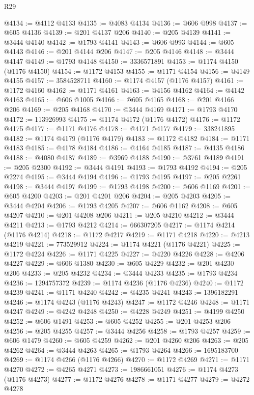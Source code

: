 \begin{lexlean}{R29}
\begin{coremodule}
@4134 := @4112 @4133
@4135 := @4083 @4134
@4136 := @606 @998
@4137 := @605 @4136
@4139 := @201 @4137 @206
@4140 := @205 @4139
@4141 := @3444 @4140
@4142 := @1793 @4141
@4143 := @606 @993
@4144 := @605 @4143
@4146 := @201 @4144 @206
@4147 := @205 @4146
@4148 := @3444 @4147
@4149 := @1793 @4148
@4150 := 3336571891
@4153 := @1174 @4150 (@1176 @4150)
@4154 := @1172 @4153
@4155 := @1171 @4154
@4156 := @4149 @4155
@4157 := 3584528711
@4160 := @1174 @4157 (@1176 @4157)
@4161 := @1172 @4160
@4162 := @1171 @4161
@4163 := @4156 @4162
@4164 := @4142 @4163
@4165 := @606 @1005
@4166 := @605 @4165
@4168 := @201 @4166 @206
@4169 := @205 @4168
@4170 := @3444 @4169
@4171 := @1793 @4170
@4172 := 113926993
@4175 := @1174 @4172 (@1176 @4172)
@4176 := @1172 @4175
@4177 := @1171 @4176
@4178 := @4171 @4177
@4179 := 338241895
@4182 := @1174 @4179 (@1176 @4179)
@4183 := @1172 @4182
@4184 := @1171 @4183
@4185 := @4178 @4184
@4186 := @4164 @4185
@4187 := @4135 @4186
@4188 := @4080 @4187
@4189 := @3969 @4188
@4190 := @3761 @4189
@4191 := @205 @2300
@4192 := @3444 @4191
@4193 := @1793 @4192
@4194 := @205 @2274
@4195 := @3444 @4194
@4196 := @1793 @4195
@4197 := @205 @2261
@4198 := @3444 @4197
@4199 := @1793 @4198
@4200 := @606 @1169
@4201 := @605 @4200
@4203 := @201 @4201 @206
@4204 := @205 @4203
@4205 := @3444 @4204
@4206 := @1793 @4205
@4207 := @606 @1162
@4208 := @605 @4207
@4210 := @201 @4208 @206
@4211 := @205 @4210
@4212 := @3444 @4211
@4213 := @1793 @4212
@4214 := 666307205
@4217 := @1174 @4214 (@1176 @4214)
@4218 := @1172 @4217
@4219 := @1171 @4218
@4220 := @4213 @4219
@4221 := 773529912
@4224 := @1174 @4221 (@1176 @4221)
@4225 := @1172 @4224
@4226 := @1171 @4225
@4227 := @4220 @4226
@4228 := @4206 @4227
@4229 := @606 @1380
@4230 := @605 @4229
@4232 := @201 @4230 @206
@4233 := @205 @4232
@4234 := @3444 @4233
@4235 := @1793 @4234
@4236 := 1294757372
@4239 := @1174 @4236 (@1176 @4236)
@4240 := @1172 @4239
@4241 := @1171 @4240
@4242 := @4235 @4241
@4243 := 1396182291
@4246 := @1174 @4243 (@1176 @4243)
@4247 := @1172 @4246
@4248 := @1171 @4247
@4249 := @4242 @4248
@4250 := @4228 @4249
@4251 := @4199 @4250
@4252 := @606 @1491
@4253 := @605 @4252
@4255 := @201 @4253 @206
@4256 := @205 @4255
@4257 := @3444 @4256
@4258 := @1793 @4257
@4259 := @606 @1479
@4260 := @605 @4259
@4262 := @201 @4260 @206
@4263 := @205 @4262
@4264 := @3444 @4263
@4265 := @1793 @4264
@4266 := 1695183700
@4269 := @1174 @4266 (@1176 @4266)
@4270 := @1172 @4269
@4271 := @1171 @4270
@4272 := @4265 @4271
@4273 := 1986661051
@4276 := @1174 @4273 (@1176 @4273)
@4277 := @1172 @4276
@4278 := @1171 @4277
@4279 := @4272 @4278

\end{coremodule}
\end{lexlean}
